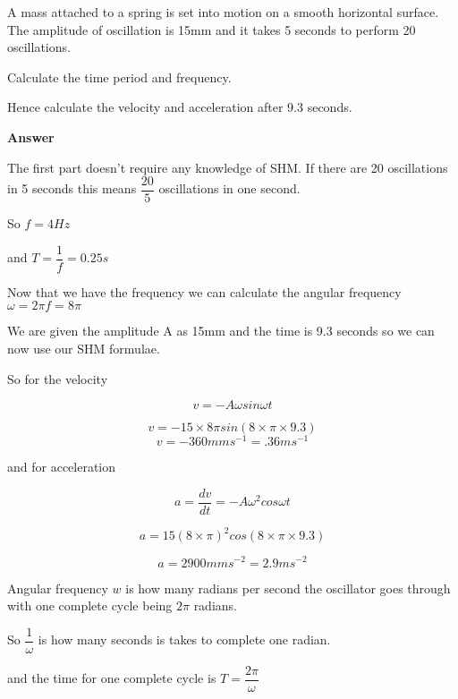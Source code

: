 \documentclass[revision-guide.tex]{subfiles}
\begin{document}
\begin{example}


A mass attached to a spring is set into motion on a smooth horizontal surface. The amplitude of oscillation is 15mm and it takes 5 seconds to perform 20 oscillations.

Calculate the time period and frequency.

Hence calculate the velocity and acceleration after 9.3 seconds.

	\vspace{1cm}
    
\textbf{Answer}

The first part doesn't require any knowledge of SHM. If there are 20 oscillations in 5 seconds this means $\dfrac{20}{5}$ oscillations in one second.

So $f=4Hz$

and $T = \dfrac{1}{f} = 0.25s$

Now that we have the frequency we can calculate the angular frequency $\omega = 2 \pi f = 8 \pi$

We are given the amplitude A as 15mm and the time is 9.3 seconds so we can now use our SHM formulae.

So for the velocity

\[
v=-A \omega sin \omega t 
\]

\[
v = -15 \times 8 \pi sin (8 \times \pi \times 9.3)
\]
\[
v = -360 mms^{-1} = .36ms^{-1}
\]

and for acceleration

\[
a = \dfrac{dv}{dt}= -A \omega^2 cos \omega t
\]

\[
a = 15 (8 \times \pi)^2 cos (8 \times \pi \times 9.3)
\]

\[
a = 2900 mms^{-2} = 2.9ms^{-2}
\]


\end{example}




Angular frequency $w$ is how many radians per second the oscillator goes through with one complete cycle being $2 \pi$ radians.

So $\dfrac{1}{\omega}$ is how many seconds is takes to complete one radian.

and the time for one complete cycle is $T = \dfrac{2 \pi}{\omega}$


\end{document}

